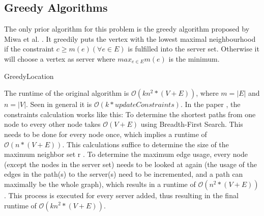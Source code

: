 \documentclass [12pt]{article}
\begin{document}
\subsection{Greedy Algorithms}
The only prior algorithm for this problem is the greedy algorithm proposed by
Miwa et al. \cite{mirrorserver}. It greedily puts the vertex with the 
lowest maximal neighbourhood if the constraint $c\geq m(e) (\forall e \in E)$ is fulfilled into the server set. 
Otherwise it will choose a vertex as server where $max_{e \in E}m(e)$ is the minimum.
\begin{algorithm}[H]
  \caption{GreedyLocation}
\end{algorithm}
The runtime of the original algorithm is $\mathcal O(kn^{2}*(V+E))$,
where $m = |E|$ and $n = |V|$. Seen  in general it is $\mathcal O(k * updateConstraints)$. 
In the paper \cite{mirrorserver}, the constraints calculation works like this:
To determine the shortest paths from one node to every other node takes 
$\mathcal O(V+E)$ using Breadth-First Search. This needs to be done for every node once,
which implies a runtime of $\mathcal O(n*(V+E))$. 
This calculations suffice to determine the size of the maximum neighbor set r . To determine the maximum
edge usage, every node (except the nodes in the server set) needs to be looked 
at again (the usage of the edges in the
path(s) to the server(s) need to be incremented, and a path can maximally be the whole graph), 
which results in a runtime of $\mathcal O(n^{2}*(V+E))$.   
This process is executed for every server added, thus resulting in the final runtime of
$\mathcal O(kn^{2}*(V+E))$. 
\end{document}
